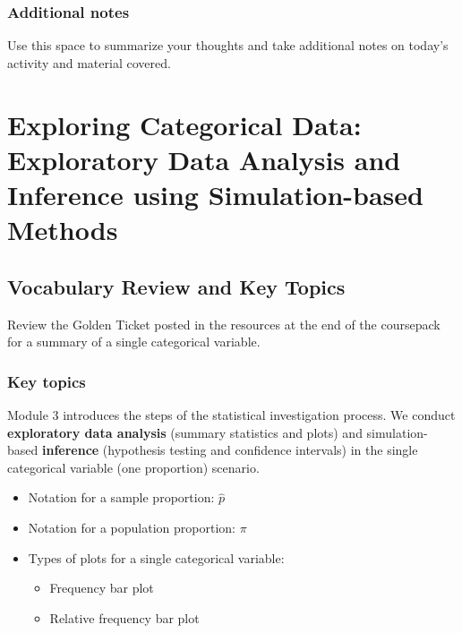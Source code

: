 \documentclass[
]{report}
\begin{document}
\subsection{Additional notes}\label{additional-notes-4}

Use this space to summarize your thoughts and take additional notes on today's activity and material covered.

\newpage

\chapter{Exploring Categorical Data: Exploratory Data Analysis and Inference using Simulation-based Methods}\label{exploring-categorical-data-exploratory-data-analysis-and-inference-using-simulation-based-methods}

\section{Vocabulary Review and Key Topics}\label{vocabulary-review-and-key-topics-2}

Review the Golden Ticket posted in the resources at the end of the coursepack for a summary of a single categorical variable.

\subsection{Key topics}\label{key-topics-2}

Module 3 introduces the steps of the statistical investigation process. We conduct \textbf{exploratory data analysis} (summary statistics and plots) and simulation-based \textbf{inference} (hypothesis testing and confidence intervals) in the single categorical variable (one proportion) scenario.

\begin{itemize}
\item
  Notation for a sample proportion: \(\hat{p}\)
\item
  Notation for a population proportion: \(\pi\)
\item
  Types of plots for a single categorical variable:

  \begin{itemize}
  \item
    Frequency bar plot
  \item
    Relative frequency bar plot
  \end{itemize}
\end{itemize}
\end{document}

